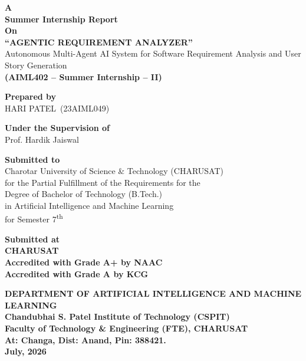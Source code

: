 \documentclass[12pt,a4paper,openany]{report}
\newcommand{\reporttitle}{AGENTIC REQUIREMENT ANALYZER}
\newcommand{\subtitle}{Autonomous Multi-Agent AI System for Software Requirement Analysis and User Story Generation}
\newcommand{\student}{HARI PATEL}
\newcommand{\rollno}{23AIML049}
\newcommand{\internalguide}{Prof. Hardik Jaiswal}
\begin{document}
\begin{titlepage}
\centering
\vspace*{0.6cm}
{\normalsize\bfseries A\\[0.12cm]}
{\Large\bfseries Summer Internship Report\\[0.12cm]}
{\normalsize\bfseries On\\[0.18cm]}
{\large\bfseries ``\reporttitle''\\[0.10cm]}
{\normalsize \subtitle\\[0.22cm]}
{\normalsize\bfseries (AIML402 -- Summer Internship -- II)\\[0.9cm]}

{\normalsize\bfseries Prepared by\\[0.12cm]}
{\normalsize \student\ (\rollno)\\[0.8cm]}

{\normalsize\bfseries Under the Supervision of\\[0.12cm]}
{\normalsize \internalguide\\[0.75cm]}

{\normalsize\bfseries Submitted to\\[0.12cm]}
{\normalsize Charotar University of Science \& Technology (CHARUSAT)\\[0.05cm]}
{\normalsize for the Partial Fulfillment of the Requirements for the\\[0.05cm]}
{\normalsize Degree of Bachelor of Technology (B.Tech.)\\[0.05cm]}
{\normalsize in Artificial Intelligence and Machine Learning\\[0.05cm]}
{\normalsize for Semester 7\textsuperscript{th}\\[0.75cm]}

{\normalsize\bfseries Submitted at\\[0.25cm]}
{\normalsize\bfseries CHARUSAT}\\[0.15cm]
{\normalsize\bfseries Accredited with Grade A+ by NAAC\\[0.04cm]}
{\normalsize\bfseries Accredited with Grade A by KCG\\[0.75cm]}

{\normalsize\bfseries DEPARTMENT OF ARTIFICIAL INTELLIGENCE AND MACHINE LEARNING\\[0.05cm]}
{\normalsize\bfseries Chandubhai S. Patel Institute of Technology (CSPIT)\\[0.05cm]}
{\normalsize\bfseries Faculty of Technology \& Engineering (FTE), CHARUSAT\\[0.05cm]}
{\normalsize\bfseries At: Changa, Dist: Anand, Pin: 388421.\\[0.25cm]}
{\normalsize\bfseries July, 2026}
\end{titlepage}
\end{document}
